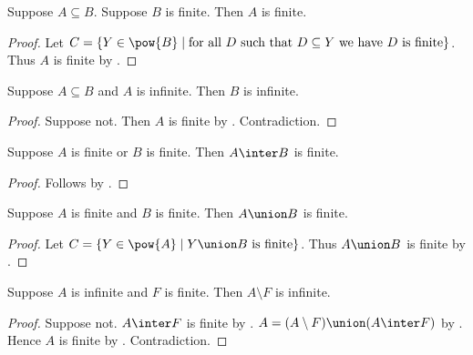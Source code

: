 \begin{proposition}\label{subseteq_finite_is_finite}
    Suppose $A\subseteq B$.
    Suppose $B$ is finite.
    Then $A$ is finite.
\end{proposition}
\begin{proof}
    Let $C=\{Y\in\pow{B}\mid
        \text{for all $D$ such that $D\subseteq Y$ we have $D$ is finite}\}$.
    Thus $A$ is finite by .
\end{proof}

\begin{theorem}\label{infinite_superset}
    Suppose $A\subseteq B$ and $A$ is infinite.
    Then $B$ is infinite.
\end{theorem}
\begin{proof}
    Suppose not.
    Then $A$ is finite by .
    Contradiction.
\end{proof}

\begin{corollary}\label{finite_intersection}
    Suppose $A$ is finite or $B$ is finite.
    Then $A\inter B$ is finite.
\end{corollary}
\begin{proof}
    Follows by .
\end{proof}

\begin{proposition}\label{union_of_finite_is_finite}
    Suppose $A$ is finite and $B$ is finite.
    Then $A\union B$ is finite.
\end{proposition}
\begin{proof}
    Let $C=\{Y\in\pow{A}\mid \text{$Y\union B$ is finite}\}$.
    Thus $A\union B$ is finite by .
\end{proof}

\begin{theorem}\label{infinite_minus_finite_is_infinite}
    Suppose $A$ is infinite and $F$ is finite.
    Then $A\setminus F$ is infinite.
\end{theorem}
\begin{proof}
    Suppose not.
    $A\inter F$ is finite by .
    $A=(A\setminus F)\union(A\inter F)$
        by .
    Hence $A$ is finite by .
    Contradiction.
\end{proof}

